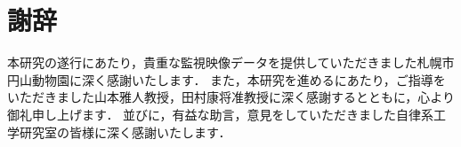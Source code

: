 \chapter*{謝辞}
本研究の遂行にあたり，貴重な監視映像データを提供していただきました札幌市円山動物園に深く感謝いたします．
また，本研究を進めるにあたり，ご指導をいただきました山本雅人教授，田村康将准教授に深く感謝するとともに，心より御礼申し上げます．
並びに，有益な助言，意見をしていただきました自律系工学研究室の皆様に深く感謝いたします．